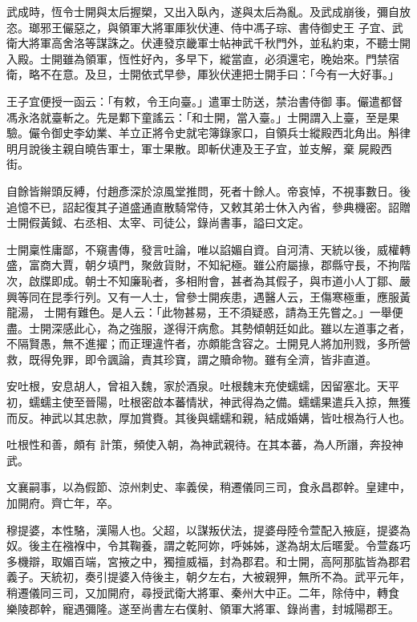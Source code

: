 \begin{pinyinscope}
 武成時，恆令士開與太后握槊，又出入臥內，遂與太后為亂。及武成崩後，彌自放恣。瑯邪王儼惡之，與領軍大將軍厙狄伏連、侍中馮子琮、書侍御史王
 子宜、武衛大將軍高舍洛等謀誅之。伏連發京畿軍士帖神武千秋門外，並私約束，不聽士開入殿。士開雖為領軍，恆性好內，多早下，縱當直，必須還宅，晚始來。門禁宿衛，略不在意。及旦，士開依式早參，厙狄伏連把士開手曰：「今有一大好事。」



 王子宜便授一函云：「有敕，令王向臺。」遣軍士防送，禁治書侍御事。儼遣都督馮永洛就臺斬之。先是鄴下童謠云：「和士開，當入臺。」士開謂入上臺，至是果驗。儼令御史李幼業、羊立正將令史就宅簿錄家口，自領兵士縱殿西北角出。斛律明月說後主親自曉告軍士，軍士果散。即斬伏連及王子宜，並支解，棄
 屍殿西街。



 自餘皆辮頭反縛，付趙彥深於涼風堂推問，死者十餘人。帝哀悼，不視事數日。後追憶不已，詔起復其子道盛通直散騎常侍，又敕其弟士休入內省，參典機密。詔贈士開假黃鉞、右丞相、太宰、司徒公，錄尚書事，謚曰文定。



 士開稟性庸鄙，不窺書傳，發言吐論，唯以諂媚自資。自河清、天統以後，威權轉盛，富商大賈，朝夕填門，聚斂貨財，不知紀極。雖公府屬掾，郡縣守長，不拘階次，啟牒即成。朝士不知廉恥者，多相附會，甚者為其假子，與市道小人丁鄒、嚴興等同在昆季行列。又有一人士，曾參士開疾患，遇醫人云，王傷寒極重，應服黃龍湯，
 士開有難色。是人云：「此物甚易，王不須疑惑，請為王先嘗之。」一舉便盡。士開深感此心，為之強服，遂得汗病愈。其勢傾朝廷如此。雖以左道事之者，不隔賢愚，無不進擢；而正理違忤者，亦頗能含容之。士開見人將加刑戮，多所營救，既得免罪，即令諷論，責其珍寶，謂之贖命物。雖有全濟，皆非直道。



 安吐根，安息胡人，曾祖入魏，家於酒泉。吐根魏末充使蠕蠕，因留塞北。天平初，蠕蠕主使至晉陽，吐根密啟本蕃情狀，神武得為之備。蠕蠕果遣兵入掠，無獲而反。神武以其忠款，厚加賞賚。其後與蠕蠕和親，結成婚媾，皆吐根為行人也。



 吐根性和善，頗有
 計策，頻使入朝，為神武親待。在其本蕃，為人所譖，奔投神武。



 文襄嗣事，以為假節、涼州刺史、率義侯，稍遷儀同三司，食永昌郡幹。皇建中，加開府。齊亡年，卒。



 穆提婆，本性駱，漢陽人也。父超，以謀叛伏法，提婆母陸令萱配入掖庭，提婆為奴。後主在襁褓中，令其鞠養，謂之乾阿妳，呼姊姊，遂為胡太后暱愛。令萱姦巧多機辯，取媚百端，宮掖之中，獨擅威福，封為郡君。和士開，高阿那肱皆為郡君義子。天統初，奏引提婆入侍後主，朝夕左右，大被親狎，無所不為。武平元年，稍遷儀同三司，又加開府，尋授武衛大將軍、秦州大中正。二年，除侍中，轉食
 樂陵郡幹，寵遇彌隆。遂至尚書左右僕射、領軍大將軍、錄尚書，封城陽郡王。




\end{pinyinscope}
